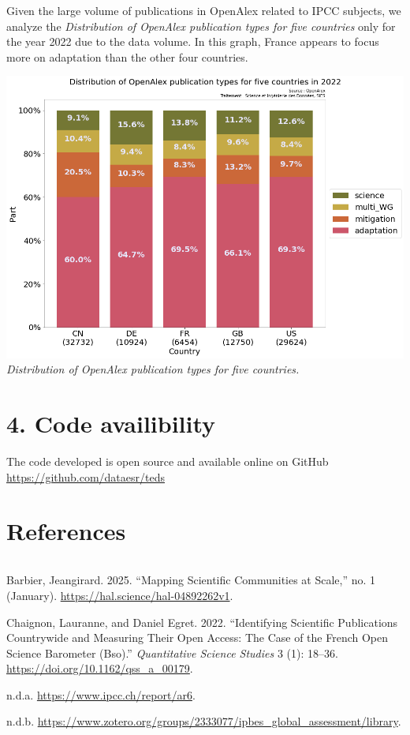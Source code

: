 \documentclass[
]{article}
\newlength{\cslhangindent}
\newenvironment{cslreferences}%
  {\setlength{\parindent}{0pt}%
  \everypar{\setlength{\hangindent}{\cslhangindent}}\ignorespaces}%
  {\par}
\begin{document}
Given the large volume of publications in OpenAlex related to IPCC
subjects, we analyze the \emph{Distribution of OpenAlex publication
types for five countries} only for the year 2022 due to the data volume.
In this graph, France appears to focus more on adaptation than the other
four countries.

\includegraphics{./images/teds_OpenAlex_publications_for_5_countries.png}
\emph{Distribution of OpenAlex publication types for five countries.}

\hypertarget{code-availibility}{%
\section{4. Code availibility}\label{code-availibility}}

The code developed is open source and available online on GitHub
\url{https://github.com/dataesr/teds}

\hypertarget{references}{%
\section{References}\label{references}}

\begin{verbatim}
\end{verbatim}

\hypertarget{refs}{}
\begin{cslreferences}
\leavevmode\hypertarget{ref-hal-04892262}{}%
Barbier, Jeangirard. 2025. ``Mapping Scientific Communities at Scale,''
no. 1 (January). \url{https://hal.science/hal-04892262v1}.

\leavevmode\hypertarget{ref-10.1162ux2fqss_a_00179}{}%
Chaignon, Lauranne, and Daniel Egret. 2022. ``Identifying Scientific
Publications Countrywide and Measuring Their Open Access: The Case of
the French Open Science Barometer (Bso).'' \emph{Quantitative Science
Studies} 3 (1): 18--36. \url{https://doi.org/10.1162/qss_a_00179}.

\leavevmode\hypertarget{ref-ipccbibliography}{}%
n.d.a. \url{https://www.ipcc.ch/report/ar6}.

\leavevmode\hypertarget{ref-ipbesbibliography}{}%
n.d.b.
\url{https://www.zotero.org/groups/2333077/ipbes_global_assessment/library}.
\end{cslreferences}
\end{document}
